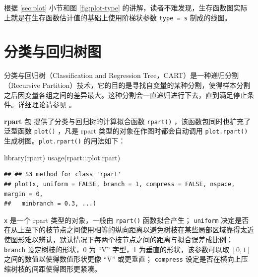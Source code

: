 \documentclass[
  b5paper,
  UTF8,twoside]{book}
\newenvironment{Shaded}{\begin{snugshade}}{\end{snugshade}}
\newcommand{\FunctionTok}[1]{\textcolor[rgb]{0.00,0.00,0.00}{#1}}
\newcommand{\NormalTok}[1]{#1}
\newcommand{\SpecialCharTok}[1]{\textcolor[rgb]{0.00,0.00,0.00}{#1}}
\begin{document}
根据 \ref{sec:plot} 小节和图 \ref{fig:plot-type}
的讲解，读者不难发现，生存函数图实际上就是在生存函数估计值的基础上使用阶梯状参数 \texttt{type\ =\ \textquotesingle{}s\textquotesingle{}} 制成的线图。

\hypertarget{sec:rpart}{%
\section{分类与回归树图}\label{sec:rpart}}

分类与回归树（Classification and Regression Tree，CART）是一种递归分割（Recursive Partition）技术，它的目的是寻找自变量的某种分割，使得样本分割之后因变量各组之间的差异最大。这种分割会一直递归进行下去，直到满足停止条件。详细理论请参见 \citet{Breiman84}。

\textbf{rpart} 包 \citep{rpart} 提供了分类与回归树的计算拟合函数 \texttt{rpart()} ，该函数包同时也扩充了泛型函数 \texttt{plot()} ，凡是 rpart 类型的对象在作图时都会自动调用 \texttt{plot.rpart()} 生成树图。\texttt{plot.rpart()} 的用法如下：

\begin{Shaded}
\begin{Highlighting}[]
\FunctionTok{library}\NormalTok{(rpart)}
\FunctionTok{usage}\NormalTok{(rpart}\SpecialCharTok{:::}\NormalTok{plot.rpart)}
\end{Highlighting}
\end{Shaded}

\begin{verbatim}
## ## S3 method for class 'rpart'
## plot(x, uniform = FALSE, branch = 1, compress = FALSE, nspace, margin = 0,
##   minbranch = 0.3, ...)
\end{verbatim}

\texttt{x} 是一个 rpart 类型的对象，一般由 \texttt{rpart()} 函数拟合产生； \texttt{uniform} 决定是否在从上至下的枝节点之间使用相等的纵向距离以避免树枝在某些局部区域靠得太近使图形难以辨认，默认情况下每两个枝节点之间的距离与拟合误差成比例； \texttt{branch} 设定树枝的形状，0 为 ``V'' 字型，1 为垂直的形状，该参数可以取 \([0,1]\) 之间的数值以使得数值形状更像 ``V'' 或更垂直； \texttt{compress} 设定是否在横向上压缩树枝的间距使得图形更紧凑。
\end{document}
